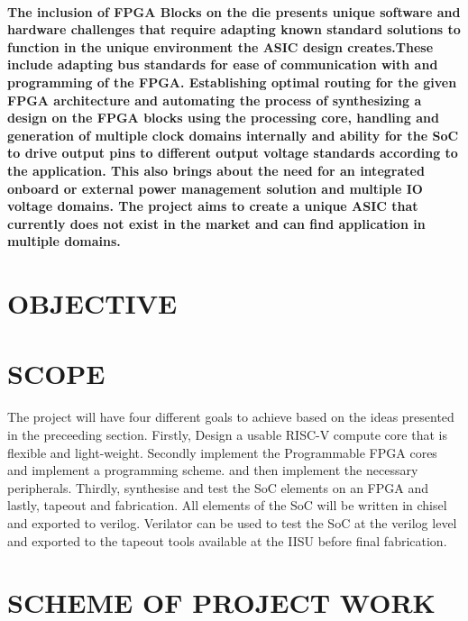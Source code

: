\documentclass[12pt,a4paper]{report}
\begin{document}
\paragraph{\textrm{\textmd{The inclusion of FPGA Blocks on the die presents unique software and hardware challenges that require adapting known standard solutions to function in the unique environment the ASIC design creates.These include adapting bus standards for ease of communication with and programming of the FPGA. Establishing optimal routing for the given FPGA architecture and automating the process of synthesizing a design on the FPGA blocks using the processing core, handling and generation of multiple clock domains internally and ability for the SoC to drive output pins  to different output voltage standards according to the application. This also brings about the need for an integrated onboard or external power management solution and multiple IO voltage domains. The project aims to create a unique ASIC that currently does not exist in the market and can find application in multiple domains. }}}
\section{\small \MakeUppercase{Objective}}
\section{\small \MakeUppercase{Scope}}
The project will have four different goals to achieve based on the ideas presented in the preceeding section. Firstly, Design a usable RISC-V compute core that is flexible and light-weight. Secondly implement the Programmable FPGA cores and implement a programming scheme. and then implement the necessary peripherals. Thirdly, synthesise and test the SoC elements on an FPGA and lastly, tapeout and fabrication. All elements of the SoC will be written in chisel and exported to verilog. Verilator can be used to test the SoC at the verilog level and exported to the tapeout tools available at the IISU before final fabrication.
\section{\small \MakeUppercase{Scheme of Project Work}}
\end{document}
